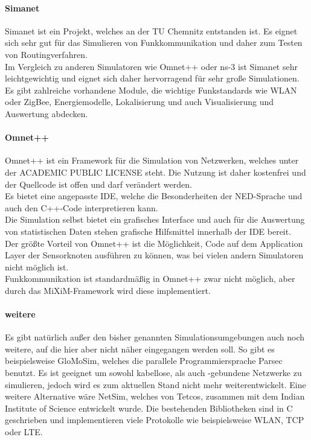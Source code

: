 \paragraph{Simanet\cite{simanet}}

Simanet ist ein Projekt, welches an der TU Chemnitz entstanden ist. Es eignet sich sehr gut für das Simulieren von Funkkommunikation und daher zum Testen von Routingverfahren.\\
Im Vergleich zu anderen Simulatoren wie Omnet++ oder ns-3 ist Simanet sehr leichtgewichtig und eignet sich daher hervorragend für sehr große Simulationen.\\
Es gibt zahlreiche vorhandene Module, die wichtige Funkstandards wie WLAN oder ZigBee, Energiemodelle, Lokalisierung und auch Visualisierung und Auswertung abdecken.

\paragraph{Omnet++\cite{omnet}}

Omnet++ ist ein Framework für die Simulation von Netzwerken, welches unter der ACADEMIC PUBLIC LICENSE steht. Die Nutzung ist daher kostenfrei und der Quellcode ist offen und darf verändert werden.\\
Es bietet eine angepasste IDE, welche die Besonderheiten der NED-Sprache und auch den C++-Code interpretieren kann.\\Die Simulation selbst bietet ein grafisches Interface und auch für die Auswertung von statistischen Daten stehen grafische Hilfsmittel innerhalb der IDE bereit.\\
Der größte Vorteil von Omnet++ ist die Möglichkeit, Code auf dem Application Layer der Sensorknoten ausführen zu können, was bei vielen andern Simulatoren nicht möglich ist.\\
Funkkommunikation ist standardmäßig in Omnet++ zwar nicht möglich, aber durch das MiXiM-Framework wird diese implementiert.

\paragraph{weitere}

Es gibt natürlich außer den bisher genannten Simulationsumgebungen auch noch weitere, auf die hier aber nicht näher eingegangen werden soll. So gibt es beispielsweise GloMoSim, welches die parallele Programmiersprache Parsec benutzt. Es ist geeignet um sowohl kabellose, als auch -gebundene Netzwerke zu simulieren, jedoch wird es zum aktuellen Stand nicht mehr weiterentwickelt. \newline
Eine weitere Alternative wäre NetSim, welches von Tetcos, zusammen mit dem Indian Institute of Science entwickelt wurde. Die bestehenden Bibliotheken sind in C geschrieben und implementieren viele Protokolle wie beispielsweise WLAN, TCP oder LTE.

